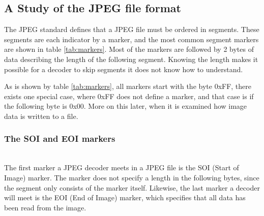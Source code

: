 \begin{infobox}{\section[A Study of the JPEG file format]{A Study of the JPEG file format}}
The JPEG standard defines that a JPEG file must be ordered in segments. These segments are each indicator by a marker, and the most common segment markers are shown in table \ref{tab:markers}. Most of the markers are followed by 2 bytes of data describing the length of the following segment. Knowing the length makes it possible for a decoder to skip segments it does not know how to understand. 

As is shown by table \ref{tab:markers}, all markers start with the byte 0xFF, there exists one special case, where 0xFF does not define a marker, and that case is if the following byte is 0x00. More on this later, when it is examined how image data is written to a file.

\subsubsection*{The SOI and EOI markers}
\begin{centering}
\hspace{1.2cm} 
\end{centering}\\
The first marker a JPEG decoder meets in a JPEG file is the SOI (Start of Image) marker. The marker does not specify a length in the following bytes, since the segment only consists of the marker itself. Likewise, the last marker a decoder will meet is the EOI (End of Image) marker, which specifies that all data has been read from the image.


\end{infobox}
